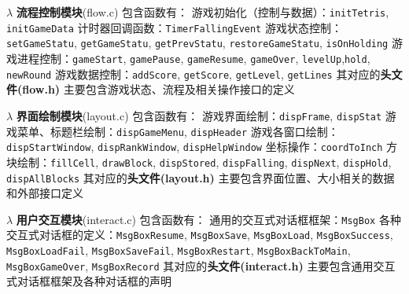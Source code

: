 \documentclass{style/ucasproposal}
\newcommand{\cinline}[1]{\texttt{#1}}
\begin{document}
$\lambda$\newline
\textbf{流程控制模块}(flow.c) 包含函数有：\newline
游戏初始化（控制与数据）：\cinline{initTetris}, \cinline{initGameData}\newline
计时器回调函数：\cinline{TimerFallingEvent}\newline
游戏状态控制：\cinline{setGameStatu}, \cinline{getGameStatu},\newline
\cinline{getPrevStatu}, \cinline{restoreGameStatu}, \cinline{isOnHolding}\newline
游戏进程控制：\cinline{gameStart}, \cinline{gamePause}, \cinline{gameResume}, \cinline{gameOver},\newline
\cinline{levelUp},\cinline{hold}, \cinline{newRound}\newline
游戏数据控制：\cinline{addScore}, \cinline{getScore}, \cinline{getLevel}, \cinline{getLines}\newline
其对应的\textbf{头文件(flow.h)} 主要包含游戏状态、流程及相关操作接口的定义

$\lambda$\newline
\textbf{界面绘制模块}(layout.c) 包含函数有：\newline
游戏界面绘制：\cinline{dispFrame}, \cinline{dispStat}\newline
游戏菜单、标题栏绘制：\cinline{dispGameMenu}, \cinline{dispHeader}\newline
游戏各窗口绘制：\cinline{dispStartWindow}, \cinline{dispRankWindow}, \cinline{dispHelpWindow}\newline
坐标操作：\cinline{coordToInch}\newline
方块绘制：\cinline{fillCell}, \cinline{drawBlock}, \cinline{dispStored}, \cinline{dispFalling},\newline
\cinline{dispNext}, \cinline{dispHold}, \cinline{dispAllBlocks}
其对应的\textbf{头文件(layout.h)} 主要包含界面位置、大小相关的数据和外部接口定义

$\lambda$\newline
\textbf{用户交互模块}(interact.c) 包含函数有：\newline
通用的交互式对话框框架：\cinline{MsgBox}\newline
各种交互式对话框的定义：\cinline{MsgBoxResume}, \cinline{MsgBoxSave},\newline
\cinline{MsgBoxLoad}, \cinline{MsgBoxSuccess}, \cinline{MsgBoxLoadFail},\newline
\cinline{MsgBoxSaveFail}, \cinline{MsgBoxRestart}, \cinline{MsgBoxBackToMain},\newline
\cinline{MsgBoxGameOver}, \cinline{MsgBoxRecord}
其对应的\textbf{头文件(interact.h)} 主要包含通用交互式对话框框架及各种对话框的声明
\end{document}

